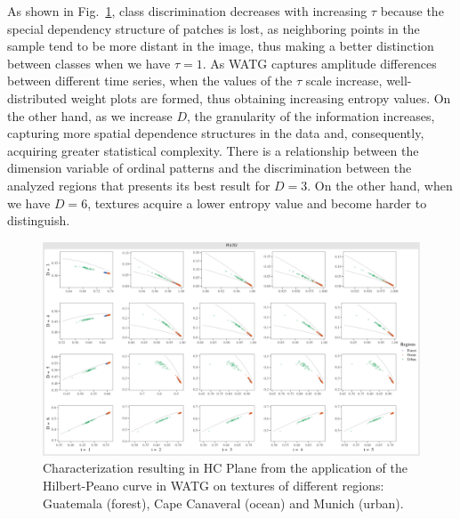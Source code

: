 \documentclass[journal]{IEEEtran}
\begin{document}
	As shown in Fig.~\ref{fig:Regions}, class discrimination decreases with increasing $\tau$ because the special dependency structure of patches is lost, as neighboring points in the sample tend to be more distant in the image, thus making a better distinction between classes when we have $\tau = 1$.
	As WATG captures amplitude differences between different time series, when the values of the $\tau$ scale increase, well-distributed weight plots are formed, thus obtaining increasing entropy values.
	On the other hand, as we increase $D$, the granularity of the information increases, capturing more spatial dependence structures in the data and, consequently, acquiring greater statistical complexity.
	There is a relationship between the dimension variable of ordinal patterns and the discrimination between the analyzed regions that presents its best result for $D = 3$.
	On the other hand, when we have $D = 6$, textures acquire a lower entropy value and become harder to distinguish.
	\begin{figure}
		\centering
		\includegraphics[width=1\textwidth]{Figures/WATGHC.pdf}
		\caption{Characterization resulting in HC Plane from the application of the Hilbert-Peano curve in WATG on textures of different regions: Guatemala (forest), Cape Canaveral (ocean) and Munich (urban).}
		\label{fig:Regions}
	\end{figure}
	
\end{document}
